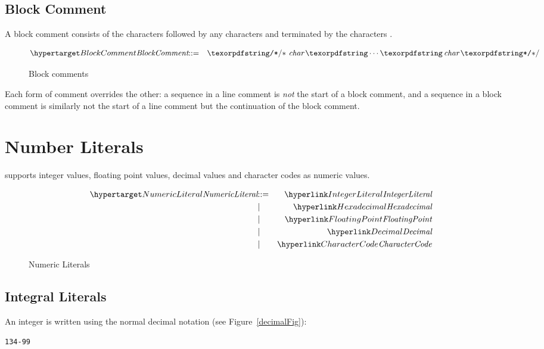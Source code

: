 \subsection{Block Comment}
A block comment consists of the characters \q{/*} followed by any characters and terminated by the characters \q{*/}.

\begin{figure}[htbp]
\begin{eqnarray*}
\ntDef{BlockComment}&\arrow&\q{/*}\ \emph{char}\sequence{}\emph{char}\,\q{*/}
\end{eqnarray*}
\caption{Block comments}
\label{blockCommentFig}
\end{figure}

\noindent
Each form of comment overrides the other: a \q{/*} sequence in a line comment is \emph{not} the start of a block comment, and a \q{--\spce} sequence in a block comment is similarly not the start of a line comment but the continuation of the block comment.

\section{Number Literals}
\label{numericLiteral}
\Sr supports integer values, floating point values, decimal values and character codes as numeric values.

\begin{figure}[htbp]
\begin{eqnarray*}
\ntDef{NumericLiteral}&\arrow&\ntRef{IntegerLiteral}\\
&\choice&\ntRef{Hexadecimal}\\
&\choice&\ntRef{FloatingPoint}\\
&\choice&\ntRef{Decimal}\\
&\choice&\ntRef{CharacterCode}
\end{eqnarray*}
\caption{Numeric Literals}
\label{numberFig}
\end{figure}


\subsection{Integral Literals}
\label{Integers}
An integer is written using the normal decimal notation (see Figure~\vref{decimalFig}):
\begin{alltt}
1  34 -99
\end{alltt}

